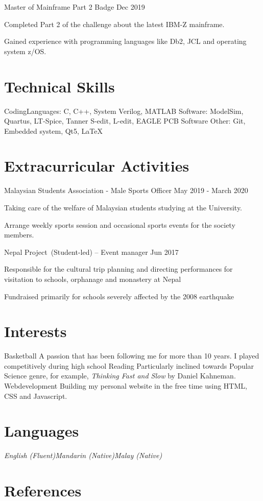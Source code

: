 \documentclass{myresume2}
\begin{document}
\simpleEntry
  {Master of Mainframe Part 2 Badge}
  {Dec 2019}
  {\item Completed Part 2 of the challenge about the latest IBM-Z mainframe.
  \item Gained experience with programming languages like Db2, JCL and operating system z/OS.}
%
%
%
%
\section{Technical Skills}
\twocolumnEntry
  {Coding\newline Languages:}
  {C, C++, System Verilog, MATLAB}
\twocolumnEntry
  {Software:}
  {ModelSim, Quartus, LT-Spice, Tanner S-edit, L-edit, EAGLE PCB Software}
\twocolumnEntry
  {Other:}
  {Git, Embedded system, Qt5, LaTeX}
%
%
%
%
\section{Extracurricular Activities}
%
\simpleEntry
  {Malaysian Students Association - Male Sports Officer}
  {May 2019 - March 2020}
  {\item Taking care of the welfare of Malaysian students studying at the University.
  \item Arrange weekly sports session and occasional sports events for the society members.}

\simpleEntry
  {Nepal Project (Student-led) – Event manager}
  {Jun 2017}
  {\item Responsible for the cultural trip planning and directing performances for visitation to schools, orphanage and monastery at Nepal
  \item Fundraised primarily for schools severely affected by the 2008 earthquake}
%
%
%
%
\section{Interests}
%
\twocolumnEntry
  {Basketball}
  {A passion that has been following me for more than 10 years. I played competitively during high school}
\twocolumnEntry
  {Reading}
  {Particularly inclined towards Popular Science genre, for example, \textit{Thinking Fast and Slow} by Daniel Kahneman.}
\twocolumnEntry
  {Web\newline development}
  {Building my personal website in the free time using HTML, CSS and Javascript.}   %
%
\section{Languages}
\textit{English (Fluent)\bigs Mandarin (Native)\bigs Malay (Native)}
%
\section{References}
%
\end{document}
